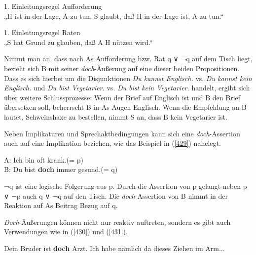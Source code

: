 \begin{exe}
	\ex\label{427} 
	1. Einleitungsregel Aufforderung \\
	„H ist in der Lage, A zu tun. S glaubt, daß H in der Lage ist, A zu tun.“
\end{exe}

\begin{exe}
	\ex\label{428} 
	1. Einleitungsregel Raten \\
	„S hat Grund zu glauben, daß A H nützen wird.“
	\hfill\hbox{\citet[100/104]{Searle1971}}
\end{exe}		  
Nimmt man an, dass nach As Aufforderung bzw. Rat q ∨ ¬q auf dem Tisch liegt, bezieht sich B mit seiner \textit{doch}-Äußerung auf eine dieser beiden Propositionen. Dass es sich hierbei um die Disjunktionen \textit{Du kannst Englisch.} vs. \textit{Du kannst kein Englisch.} und \textit{Du bist Vegetarier.} vs. \textit{Du bist kein Vegetarier.} handelt, ergibt sich über weitere Schlussprozesse: Wenn der Brief auf Englisch ist und B den Brief übersetzen soll, beherrscht B in As Augen Englisch. Wenn die Empfehlung an B lautet, Schweinshaxe zu bestellen, nimmt S an, dass B kein Vegetarier ist.

Neben Implikaturen und Sprechaktbedingungen kann sich eine \textit{doch}-Asser\-tion auch auf eine Implikation  beziehen, wie das Beispiel in (\ref{429}) nahelegt.

\begin{exe}
	\ex\label{429} 
	A: Ich bin oft krank.(= p)\\
	B: Du bist \textbf{doch} immer gesund.(= q)
	\hfill\hbox{\citet[132]{Egg2013}}
\end{exe}
¬q ist eine logische Folgerung aus p. Durch die Assertion von p gelangt neben p ∨ ¬p auch q ∨ ¬q auf den Tisch. Die \textit{doch}-Assertion von B nimmt in der Reaktion auf As Beitrag Bezug auf q.

\textit{Doch}-Äußerungen können nicht nur reaktiv auftreten, sondern es gibt auch Verwendungen wie in (\ref{430}) und (\ref{431}).

\begin{exe}
	\ex\label{430} 
	Dein Bruder ist \textbf{doch} Arzt. Ich habe nämlich da dieses Ziehen im Arm... 
	\newline
	\hbox{}\hfill\hbox{\citet[133--134]{Hentschel1986}}
\end{exe}	

